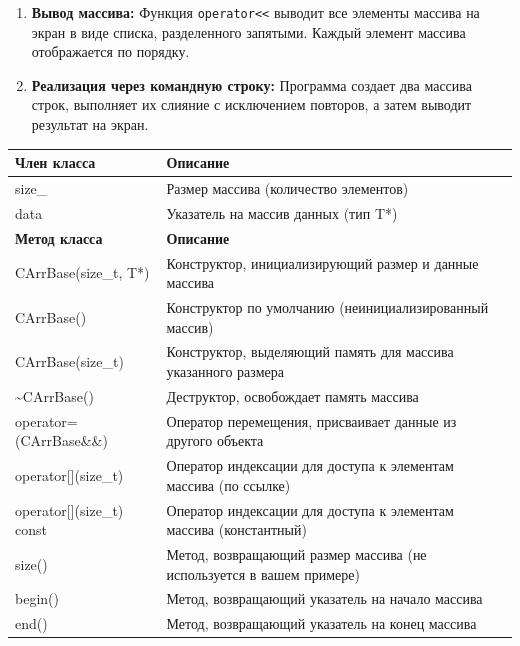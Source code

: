 \documentclass[14pt,a4paper]{article}
\begin{document}
{\begin{enumerate}
  \item \textbf{Вывод массива:} Функция \texttt{operator<<} выводит все элементы массива на экран в виде списка, разделенного запятыми. Каждый элемент массива отображается по порядку.
  \item \textbf{Реализация через командную строку:} Программа создает два массива строк, выполняет их слияние с исключением повторов, а затем выводит результат на экран.
\end{enumerate}

\begin{table}[H]
  \centering
  \begin{tabular}{|l|l|} \hline
    \textbf{Член класса} & \textbf{Описание} \\ \hline
    size\_ & Размер массива (количество элементов) \\ \hline
    data & Указатель на массив данных (тип T*) \\ \hline
    \textbf{Метод класса} & \textbf{Описание} \\ \hline
    CArrBase(size\_t, T*) & Конструктор, инициализирующий размер и данные массива \\ \hline
    CArrBase() & Конструктор по умолчанию (неинициализированный массив) \\ \hline
    CArrBase(size\_t) & Конструктор, выделяющий память для массива указанного размера \\ \hline
    \textasciitilde CArrBase() & Деструктор, освобождает память массива \\ \hline
    operator=(CArrBase\&\&) & Оператор перемещения, присваивает данные из другого объекта \\ \hline
    operator[](size\_t) & Оператор индексации для доступа к элементам массива (по ссылке) \\ \hline
    operator[](size\_t) const & Оператор индексации для доступа к элементам массива (константный) \\ \hline
    size() & Метод, возвращающий размер массива (не используется в вашем примере) \\ \hline
    begin() & Метод, возвращающий указатель на начало массива \\ \hline
    end() & Метод, возвращающий указатель на конец массива \\ \hline

\end{tabular}
\end{table}}
\end{document}
